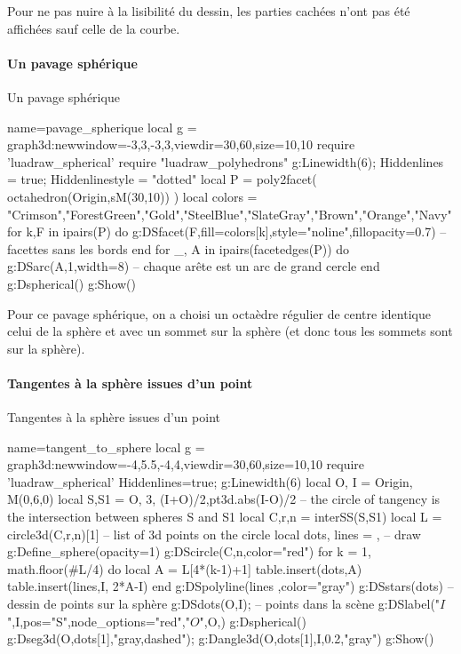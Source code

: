 Pour ne pas nuire à la lisibilité du dessin, les parties cachées n'ont pas été affichées sauf celle de la courbe.

\paragraph{Un pavage sphérique}

\begin{demo}{Un pavage sphérique}
\begin{luadraw}{name=pavage_spherique}
local g = graph3d:new{window={-3,3,-3,3},viewdir={30,60},size={10,10}}
require 'luadraw_spherical'
require "luadraw_polyhedrons"
g:Linewidth(6); Hiddenlines = true; Hiddenlinestyle = "dotted"
local P = poly2facet( octahedron(Origin,sM(30,10)) )
local colors = {"Crimson","ForestGreen","Gold","SteelBlue","SlateGray","Brown","Orange","Navy"}
for k,F in ipairs(P) do
    g:DSfacet(F,{fill=colors[k],style="noline",fillopacity=0.7})  -- facettes sans les bords
end
for _, A in ipairs(facetedges(P)) do
    g:DSarc(A,1,{width=8}) -- chaque arête est un arc de grand cercle
end
g:Dspherical()
g:Show()
\end{luadraw}
\end{demo}

Pour ce pavage sphérique, on a choisi un octaèdre régulier de centre identique celui de la sphère et avec un sommet sur la sphère (et donc tous les sommets sont sur la sphère).

\paragraph{Tangentes à la sphère issues d'un point}

\begin{demo}{Tangentes à la sphère issues d'un point}
\begin{luadraw}{name=tangent_to_sphere}
local g = graph3d:new{window={-4,5.5,-4,4},viewdir={30,60},size={10,10}}
require 'luadraw_spherical'
Hiddenlines=true; g:Linewidth(6)
local O, I = Origin, M(0,6,0)
local S,S1 = {O, 3}, {(I+O)/2,pt3d.abs(I-O)/2}
-- the circle of tangency is the intersection between spheres S and S1
local C,r,n = interSS(S,S1) 
local L = circle3d(C,r,n)[1] -- list of 3d points on the circle
local dots, lines = {}, {}
-- draw
g:Define_sphere({opacity=1})
g:DScircle({C,n},{color="red"})
for k = 1, math.floor(#L/4) do
    local A = L[4*(k-1)+1]
    table.insert(dots,A)
    table.insert(lines,{I, 2*A-I})
end
g:DSpolyline(lines ,{color="gray"})
g:DSstars(dots) -- dessin de points sur la sphère
g:DSdots({O,I});  -- points dans la scène
g:DSlabel("$I$",I,{pos="S",node_options="red"},"$O$",O,{})
g:Dspherical()
g:Dseg3d({O,dots[1]},"gray,dashed"); g:Dangle3d(O,dots[1],I,0.2,"gray")
g:Show() 
\end{luadraw}
\end{demo}

